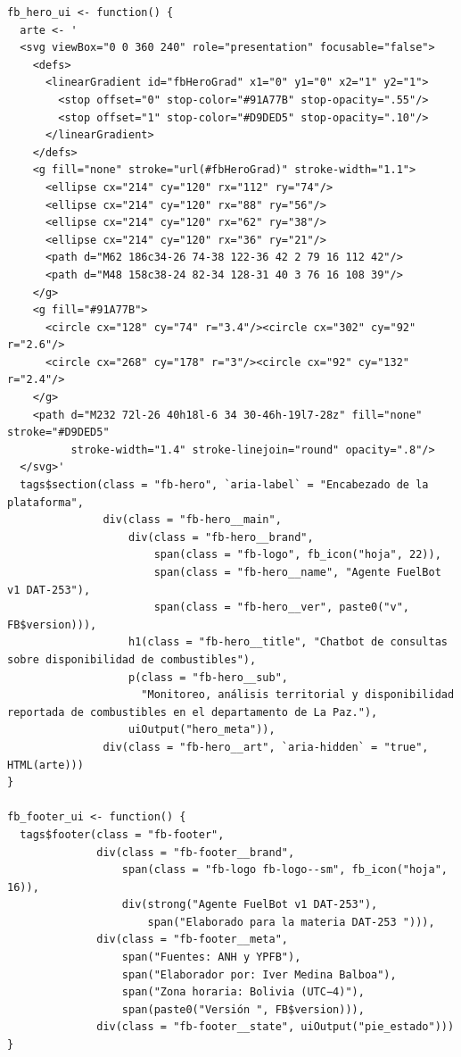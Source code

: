 \begin{lstlisting}[style=anexoR]
fb_hero_ui <- function() {
  arte <- '
  <svg viewBox="0 0 360 240" role="presentation" focusable="false">
    <defs>
      <linearGradient id="fbHeroGrad" x1="0" y1="0" x2="1" y2="1">
        <stop offset="0" stop-color="#91A77B" stop-opacity=".55"/>
        <stop offset="1" stop-color="#D9DED5" stop-opacity=".10"/>
      </linearGradient>
    </defs>
    <g fill="none" stroke="url(#fbHeroGrad)" stroke-width="1.1">
      <ellipse cx="214" cy="120" rx="112" ry="74"/>
      <ellipse cx="214" cy="120" rx="88" ry="56"/>
      <ellipse cx="214" cy="120" rx="62" ry="38"/>
      <ellipse cx="214" cy="120" rx="36" ry="21"/>
      <path d="M62 186c34-26 74-38 122-36 42 2 79 16 112 42"/>
      <path d="M48 158c38-24 82-34 128-31 40 3 76 16 108 39"/>
    </g>
    <g fill="#91A77B">
      <circle cx="128" cy="74" r="3.4"/><circle cx="302" cy="92" r="2.6"/>
      <circle cx="268" cy="178" r="3"/><circle cx="92" cy="132" r="2.4"/>
    </g>
    <path d="M232 72l-26 40h18l-6 34 30-46h-19l7-28z" fill="none" stroke="#D9DED5"
          stroke-width="1.4" stroke-linejoin="round" opacity=".8"/>
  </svg>'
  tags$section(class = "fb-hero", `aria-label` = "Encabezado de la plataforma",
               div(class = "fb-hero__main",
                   div(class = "fb-hero__brand",
                       span(class = "fb-logo", fb_icon("hoja", 22)),
                       span(class = "fb-hero__name", "Agente FuelBot v1 DAT-253"),
                       span(class = "fb-hero__ver", paste0("v", FB$version))),
                   h1(class = "fb-hero__title", "Chatbot de consultas sobre disponibilidad de combustibles"),
                   p(class = "fb-hero__sub",
                     "Monitoreo, análisis territorial y disponibilidad reportada de combustibles en el departamento de La Paz."),
                   uiOutput("hero_meta")),
               div(class = "fb-hero__art", `aria-hidden` = "true", HTML(arte)))
}

fb_footer_ui <- function() {
  tags$footer(class = "fb-footer",
              div(class = "fb-footer__brand",
                  span(class = "fb-logo fb-logo--sm", fb_icon("hoja", 16)),
                  div(strong("Agente FuelBot v1 DAT-253"),
                      span("Elaborado para la materia DAT-253 "))),
              div(class = "fb-footer__meta",
                  span("Fuentes: ANH y YPFB"),
                  span("Elaborador por: Iver Medina Balboa"),
                  span("Zona horaria: Bolivia (UTC−4)"),
                  span(paste0("Versión ", FB$version))),
              div(class = "fb-footer__state", uiOutput("pie_estado")))
}
\end{lstlisting}


